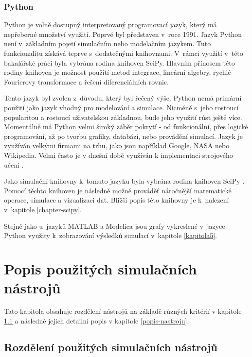 \subsection{Python}
Python je volně dostupný interpretovaný programovací jazyk, který má nepřeberné množství využití. Poprvé byl představen v~roce 1991. Jazyk Python není v~základním pojetí simulačním nebo modelačním jazykem. Tuto funkcionalitu získává teprve s~dodatečnými knihovnami. V~rámci využití v~této bakalářské práci byla vybrána rodina knihoven SciPy. Hlavním přínosem této rodiny knihoven je možnost použití metod integrace, lineární algebry, rychlé Fourierovy transformace a řešení diferenciálních rovnic.

Tento jazyk byl zvolen z~důvodu, který byl řečený výše. Python nemá primární použití jako jazyk vhodný pro modelování a simulace. Nicméně s~jeho rostoucí popularitou a rostoucí uživatelskou základnou, bude jeho využití růst ještě více. Momentálně má Python velmi široký záběr pokrytí - od funkcionální, přes logické programování, až po tvorbu grafiky, databází, nebo provádění simulací. Jazyk je využíván velkými firmami na trhu, jako jsou například Google, NASA nebo Wikipedia. Velmi často je v dnešní době využíván k implementaci strojového učení \cite{kirk2017thoughtful}.

Jako simulační knihovny k~tomuto jazyku byla vybrána rodina knihoven SciPy \cite{scipy} \cite{Nunez-Iglesias:2017:ESA:3169538}. Pomocí těchto knihoven je následně možné prováděť náročnější matematické operace, simulace a vizualizaci dat. Bližší popis této knihovny je k~nalezení v~kapitole \ref{chapter-scipy}.

Stejně jako u~jazyků MATLAB a Modelica jsou grafy vykreslené v~jazyce Python využity k~zobrazování výsledků simulací v~kapitole \ref{kapitola5}.

\chapter{Popis použitých simulačních nástrojů}
\label{kapitola3}
Tato kapitola obsahuje rozdělení nástrojů na základě různých kritérií v kapitole \ref{rozdeleni-nastroju} a následně jejich detailní popis v kapitole \ref{popis-nastroju}.

\section{Rozdělení použitých simulačních nástrojů}
\label{rozdeleni-nastroju}

